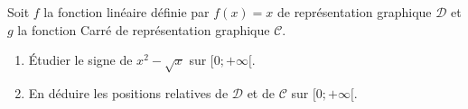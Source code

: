 
Soit $f$ la fonction linéaire définie par $f(x)=x$ de représentation graphique $\mathcal{D}$ et $g$ la fonction Carré de représentation graphique $\mathcal{C}$. 

\begin{enumerate}
\item Étudier le signe de $x^2 -\sqrt x$ sur  $[0;+\infty[$.
\item En déduire les positions relatives de $\mathcal{D}$ et de $\mathcal{C}$ sur $[0;+\infty[$.
\end{enumerate}




 

